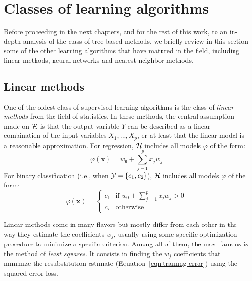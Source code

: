 \section{Classes of learning algorithms}
\label{sec:2:classes-of-algorithms}

Before proceeding in the next chapters, and for the rest of
this work, to an in-depth analysis of the class of tree-based methods,  we
briefly review in this section some of the other learning algorithms that have
matured in the field, including linear methods, neural networks and nearest
neighbor methods.

\subsection{Linear methods}

One of the oldest class of supervised learning algorithms is the class of
\textit{linear methods} from the field of statistics. In these methods, the central
assumption made on ${\cal H}$ is that the output variable $Y$ can be described
as a linear combination of the input variables $X_1, ..., X_p$, or at least
that the linear model is a reasonable approximation. For regression, ${\cal H}$
includes all models $\varphi$ of the form:
\begin{equation}
\varphi(\mathbf{x}) = w_0 + \sum_{j=1}^p x_j w_j
\end{equation}
For binary classification (i.e., when ${\cal Y}=\{c_1, c_2\}$),  ${\cal H}$ includes all
models $\varphi$ of the form:
\begin{equation}
\varphi(\mathbf{x}) = \begin{cases}
c_1 & \text{if } w_0 + \sum_{j=1}^p x_j w_j > 0\\
c_2 & \text{otherwise}
\end{cases}
\end{equation}

Linear methods come in many flavors but mostly differ from each other in the
way they estimate the coefficients $w_j$, usually using some specific
optimization procedure to minimize a specific criterion. Among all of them, the
most famous is the method of \textit{least squares}. It consists in finding the
$w_j$ coefficients that minimize the resubstitution estimate
(Equation~\ref{eqn:training-error}) using the squared error loss.

